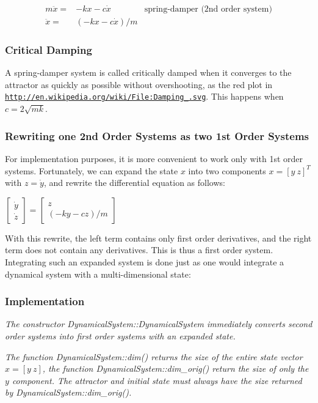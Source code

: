 \begin{eqnarray*} m\ddot{x}=& -kx -c\dot{x} & \mbox{spring-damper (2nd order system)} \label{equ_}\\ \ddot{x}=& (-kx -c\dot{x})/m & \end{eqnarray*}\hypertarget{page_dyn_sys_dyn_sys_critical_damping}{}\subsubsection{Critical Damping}\label{page_dyn_sys_dyn_sys_critical_damping}
A spring-\/damper system is called critically damped when it converges to the attractor as quickly as possible without overshooting, as the red plot in \href{http://en.wikipedia.org/wiki/File:Damping_1.svg}{\tt http\+://en.\+wikipedia.\+org/wiki/\+File\+:\+Damping\+\_.\+svg}. This happens when $c = 2\sqrt{mk}$.\hypertarget{page_dyn_sys_dyn_sys_rewrite_second_first}{}\subsubsection{Rewriting one 2nd Order Systems as two 1st Order Systems}\label{page_dyn_sys_dyn_sys_rewrite_second_first}
For implementation purposes, it is more convenient to work only with 1st order systems. Fortunately, we can expand the state $ x $ into two components $ x = [y~z]^T$ with $ z = \dot{y}$, and rewrite the differential equation as follows\+:

$ \left[ \begin{array}{l} \dot{y} \\ \dot{z} \end{array} \right] = \left[ \begin{array}{l} z \\ (-ky -cz)/m \end{array} \right] $

With this rewrite, the left term contains only first order derivatives, and the right term does not contain any derivatives. This is thus a first order system. Integrating such an expanded system is done just as one would integrate a dynamical system with a multi-\/dimensional state\+:\hypertarget{page_dyn_sys_Implementation}{}\subsubsection{Implementation}\label{page_dyn_sys_Implementation}
{\itshape  The constructor Dynamical\+System\+::\+Dynamical\+System immediately converts second order systems into first order systems with an expanded state.}

{\itshape The function Dynamical\+System\+::dim() returns the size of the entire state vector $ x = [y~z]$, the function Dynamical\+System\+::dim\+\_\+orig() return the size of only the $ y $ component. The attractor and initial state must always have the size returned by Dynamical\+System\+::dim\+\_\+orig(). } 